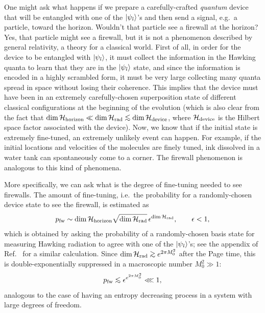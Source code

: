 \documentclass[12pt]{article}
\begin{document}
One might ask what happens if we prepare a carefully-crafted {\it quantum} 
device that will be entangled with one of the $\left| \psi_{\tilde{\imath}} \right>$'s 
and then send a signal, e.g.\ a particle, toward the horizon.  Wouldn't 
that particle see a firewall at the horizon?  Yes, that particle 
might see a firewall, but it is not a phenomenon described by general 
relativity, a theory for a classical world.  First of all, in order for 
the device to be entangled with $\left| \psi_{\tilde{\imath}} \right>$, it must 
collect the information in the Hawking quanta to learn that they are in 
the $\left| \psi_{\tilde{\imath}} \right>$ state, and since the information is 
encoded in a highly scrambled form, it must be very large collecting 
many quanta spread in space without losing their coherence.  This 
implies that the device must have been in an extremely carefully-chosen 
superposition state of different classical configurations at the beginning 
of the evolution (which is also clear from the fact that ${\rm dim}\,{\cal 
H}_{\rm horizon} \ll {\rm dim}\,{\cal H}_{\rm rad} \simlt {\rm dim}\,{\cal 
H}_{\rm device}$, where ${\cal H}_{\rm device}$ is the Hilbert space factor 
associated with the device).  Now, we know that if the initial state is 
extremely fine-tuned, an extremely unlikely event can happen.  For example, 
if the initial locations and velocities of the molecules are finely tuned, 
ink dissolved in a water tank can spontaneously come to a corner.  The 
firewall phenomenon is analogous to this kind of phenomena.

More specifically, we can ask what is the degree of fine-tuning needed 
to see firewalls.  The amount of fine-tuning, i.e.\ the probability for 
a randomly-chosen device state to see the firewall, is estimated as
%
\begin{equation}
  p_{\rm fw} \sim {\rm dim}\,{\cal H}_{\rm horizon} 
    \sqrt{{\rm dim}\,{\cal H}_{\rm rad}}\,
    \epsilon^{{\rm dim}\,{\cal H}_{\rm rad}},
\qquad
  \epsilon < 1,
\label{eq:firewall-prob}
\end{equation}
%
which is obtained by asking the probability of a randomly-chosen 
basis state for measuring Hawking radiation to agree with one of the 
$\left| \psi_{\tilde{\imath}} \right>$'s; see the appendix of Ref.~\cite{Nomura:2012sw} 
for a similar calculation.  Since ${\rm dim}\,{\cal H}_{\rm rad} \simgt 
e^{2\pi M_0^2}$ after the Page time, this is double-exponentially 
suppressed in a macroscopic number $M_0^2 \gg 1$:
%
\begin{equation}
  p_{\rm fw} \simlt \epsilon^{e^{2\pi M_0^2}} \lll 1,
\label{eq:no-firewall}
\end{equation}
%
analogous to the case of having an entropy decreasing process in 
a system with large degrees of freedom.
\end{document}
